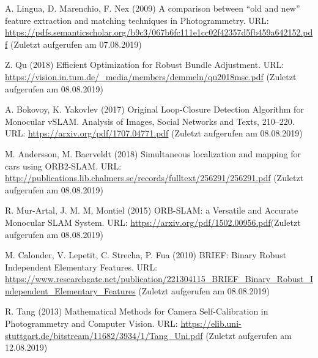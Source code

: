 \documentclass[12pt,oneside]{scrreprt}
\begin{document}
\begin{thebibliography}{10}
 A. Lingua, D. Marenchio, F. Nex (2009) A comparison between “old and new” feature extraction and matching techniques in Photogrammetry. URL: \url{https://pdfs.semanticscholar.org/b9c3/067b6fc111e1cc02f42357d5fb459a642152.pdf} (Zuletzt aufgerufen am 07.08.2019)

 Z. Qu (2018) Efficient Optimization for
Robust Bundle Adjustment. URL: \url{https://vision.in.tum.de/_media/members/demmeln/qu2018msc.pdf}  (Zuletzt aufgerufen am 08.08.2019)

 A. Bokovoy, K. Yakovlev (2017) Original Loop-Closure Detection Algorithm for Monocular vSLAM. Analysis of Images, Social Networks and Texts, 210–220. URL: \url{https://arxiv.org/pdf/1707.04771.pdf} (Zuletzt aufgerufen am 08.08.2019)

 M. Andersson, M. Baerveldt (2018) Simultaneous localization and mapping
for cars using ORB2-SLAM. URL: \url{http://publications.lib.chalmers.se/records/fulltext/256291/256291.pdf} (Zuletzt aufgerufen am 08.08.2019)

  R. Mur-Artal, J. M. M, Montiel (2015) ORB-SLAM: a Versatile and Accurate Monocular SLAM System. URL: \url{https://arxiv.org/pdf/1502.00956.pdf}(Zuletzt aufgerufen am 08.08.2019)

 M. Calonder, V. Lepetit, C. Strecha, P. Fua (2010) BRIEF: Binary Robust Independent Elementary Features. URL: \url{https://www.researchgate.net/publication/221304115_BRIEF_Binary_Robust_Independent_Elementary_Features} (Zuletzt aufgerufen am 08.08.2019)

 R. Tang (2013) Mathematical Methods for Camera Self-Calibration
in Photogrammetry and Computer Vision. URL: \url{https://elib.uni-stuttgart.de/bitstream/11682/3934/1/Tang_Uni.pdf} (Zuletzt aufgerufen am 12.08.2019)


	\end{thebibliography}  
  \newpage
  
  \listoffigures
  \newpage
 
  
\end{document}
